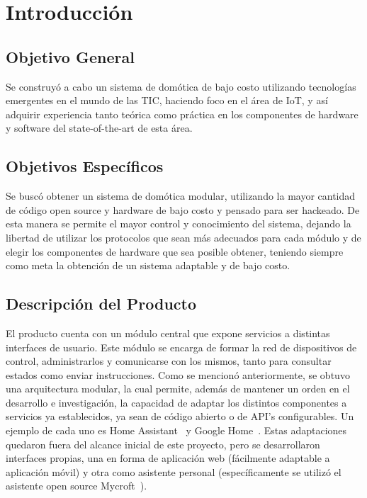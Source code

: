\chapter{Introducción}

\section{Objetivo General}

Se construyó a cabo un sistema de domótica de bajo costo utilizando tecnologías emergentes en el mundo de las TIC, haciendo foco en el área de IoT, y así adquirir experiencia tanto teórica como práctica en los componentes de hardware y software del state-of-the-art de esta área.

\section{Objetivos Específicos}

Se buscó obtener un sistema de domótica modular, utilizando la mayor cantidad de código open source y hardware de bajo costo y pensado para ser hackeado. De esta manera se permite el mayor control y conocimiento del sistema, dejando la libertad de utilizar los protocolos que sean más adecuados para cada módulo y de elegir los componentes de hardware que sea posible obtener, teniendo siempre como meta la obtención de un sistema adaptable y de bajo costo.

\section{Descripción del Producto}

El producto cuenta con un módulo central que expone servicios a distintas interfaces de usuario. Este módulo se encarga de formar la red de dispositivos de control, administrarlos y comunicarse con los mismos, tanto para consultar estados como enviar instrucciones. 
Como se mencionó anteriormente, se obtuvo una arquitectura modular, la cual permite, además de mantener un orden en el desarrollo e investigación, la capacidad de adaptar los distintos componentes a servicios ya establecidos, ya sean de código abierto o de API's configurables. Un ejemplo de cada uno es Home Assistant~\cite{HomeAssistant} y Google Home~\cite{GoogleHome}.
Estas adaptaciones quedaron fuera del alcance inicial de este proyecto, pero se desarrollaron interfaces propias, una en forma de aplicación web (fácilmente adaptable a aplicación móvil) y otra como asistente personal (específicamente se utilizó el asistente open source Mycroft~\cite{Mycroft}).

